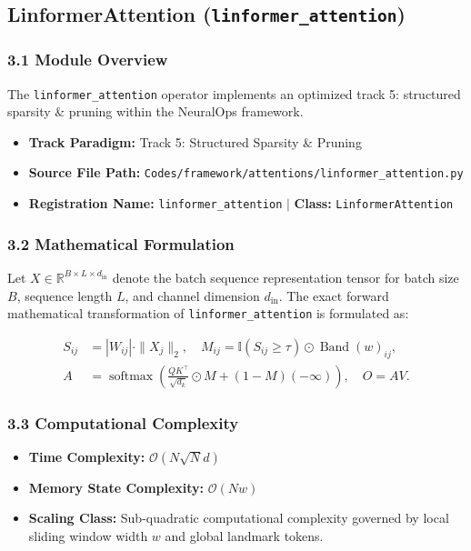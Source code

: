 \subsection{LinformerAttention (\texttt{linformer\_attention})}
\label{sec:app_module_linformer_attention}

\subsubsection*{3.1 Module Overview}
The \texttt{linformer\_attention} operator implements an optimized track 5: structured sparsity \& pruning within the NeuralOps framework.
\begin{itemize}
    \item \textbf{Track Paradigm:} Track 5: Structured Sparsity \& Pruning
    \item \textbf{Source File Path:} \texttt{Codes/framework/attentions/linformer\_attention.py}
    \item \textbf{Registration Name:} \texttt{linformer\_attention} $\mid$ \textbf{Class:} \texttt{LinformerAttention}
\end{itemize}

\subsubsection*{3.2 Mathematical Formulation}
Let $X \in \mathbb{R}^{B \times L \times d_{\text{in}}}$ denote the batch sequence representation tensor for batch size $B$, sequence length $L$, and channel dimension $d_{\text{in}}$. The exact forward mathematical transformation of \texttt{linformer\_attention} is formulated as:

\begin{align}
S_{ij} &= |W_{ij}| \cdot \|X_j\|_2, \quad M_{ij} = \mathbb{I}(S_{ij} \ge \tau) \odot \operatorname{Band}(w)_{ij}, \\
A &= \operatorname{softmax}\left(\frac{Q K^\top}{\sqrt{d_k}} \odot M + (1 - M)(-\infty)\right), \quad O = A V.
\end{align}


\subsubsection*{3.3 Computational Complexity}
\begin{itemize}
    \item \textbf{Time Complexity:} $\mathcal{O}(N \sqrt{N} d)$
    \item \textbf{Memory State Complexity:} $\mathcal{O}(N w)$
    \item \textbf{Scaling Class:} Sub-quadratic computational complexity governed by local sliding window width $w$ and global landmark tokens.
\end{itemize}

